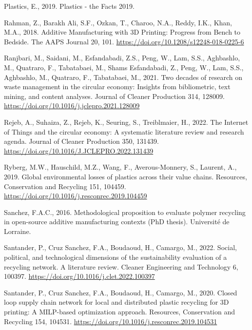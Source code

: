 \documentclass[
  11pt,
]{article}
\newlength{\cslhangindent}
\newlength{\cslentryspacingunit} %
\newenvironment{CSLReferences}[2] %
 {%
  \setlength{\parindent}{0pt}
  \ifodd #1
  \let\oldpar\par
  \def\par{\hangindent=\cslhangindent\oldpar}
  \fi
  \setlength{\parskip}{#2\cslentryspacingunit}
 }%
 {}
\begin{document}
\begin{CSLReferences}{1}{0}
\leavevmode{}%
Plastics, E., 2019. Plastics - the {Facts} 2019.

\leavevmode{}%
Rahman, Z., Barakh Ali, S.F., Ozkan, T., Charoo, N.A., Reddy, I.K.,
Khan, M.A., 2018. Additive {Manufacturing} with {3D Printing}:
{Progress} from {Bench} to {Bedside}. The AAPS Journal 20, 101.
\url{https://doi.org/10.1208/s12248-018-0225-6}

\leavevmode{}%
Ranjbari, M., Saidani, M., Esfandabadi, Z.S., Peng, W., Lam, S.S.,
Aghbashlo, M., Quatraro, F., Tabatabaei, M., Shams Esfandabadi, Z.,
Peng, W., Lam, S.S., Aghbashlo, M., Quatraro, F., Tabatabaei, M., 2021.
Two decades of research on waste management in the circular economy:
{Insights} from bibliometric, text mining, and content analyses. Journal
of Cleaner Production 314, 128009.
\url{https://doi.org/10.1016/j.jclepro.2021.128009}

\leavevmode{}%
Rejeb, A., Suhaiza, Z., Rejeb, K., Seuring, S., Treiblmaier, H., 2022.
The {Internet} of {Things} and the circular economy: {A} systematic
literature review and research agenda. Journal of Cleaner Production
350, 131439. \url{https://doi.org/10.1016/J.JCLEPRO.2022.131439}

\leavevmode{}%
Ryberg, M.W., Hauschild, M.Z., Wang, F., Averous-Monnery, S., Laurent,
A., 2019. Global environmental losses of plastics across their value
chains. Resources, Conservation and Recycling 151, 104459.
\url{https://doi.org/10.1016/j.resconrec.2019.104459}

\leavevmode{}%
Sanchez, F.A.C., 2016. Methodological proposition to evaluate polymer
recycling in open-source additive manufacturing contexts (PhD thesis).
Université de Lorraine.

\leavevmode{}%
Santander, P., Cruz Sanchez, F.A., Boudaoud, H., Camargo, M., 2022.
Social, political, and technological dimensions of the sustainability
evaluation of a recycling network. {A} literature review. Cleaner
Engineering and Technology 6, 100397.
\url{https://doi.org/10.1016/j.clet.2022.100397}

\leavevmode{}%
Santander, P., Cruz Sanchez, F.A., Boudaoud, H., Camargo, M., 2020.
Closed loop supply chain network for local and distributed plastic
recycling for {3D} printing: A {MILP-based} optimization approach.
Resources, Conservation and Recycling 154, 104531.
\url{https://doi.org/10.1016/j.resconrec.2019.104531}


\end{CSLReferences}
\end{document}
